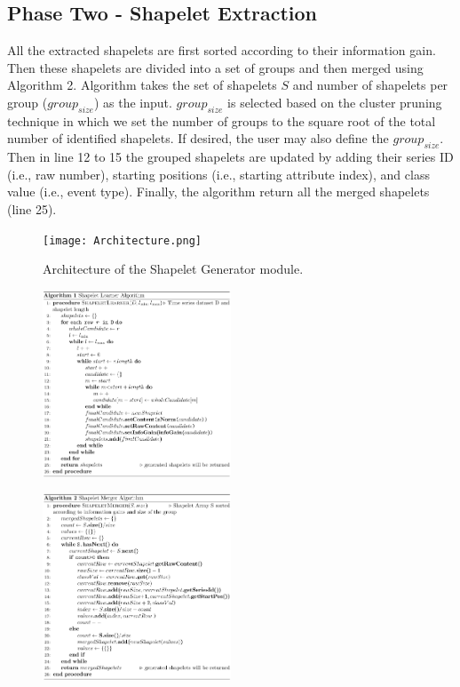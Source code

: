 \documentclass[conference]{IEEEtran}  %
\begin{document}
\subsection{Phase Two - Shapelet Extraction}
All the extracted shapelets are first sorted according to their information gain. Then these shapelets are divided into a set of groups and then merged using Algorithm 2. Algorithm takes the set of shapelets $S$ and number of shapelets per group ($group_{size}$) as the input. 
$group_{size}$ is selected based on the cluster pruning technique in which we set the number of groups to the square root of the total number of identified shapelets. If desired, the user may also define the $group_{size}$. Then in line 12 to 15 the grouped shapelets are updated by adding their series ID (i.e., raw number), starting positions (i.e., starting attribute index), and class value (i.e., event type). Finally, the algorithm return all the merged shapelets (line 25).

\begin{figure}
\texttt{[image: Architecture.png]}
\caption{Architecture of the Shapelet Generator module.}
\label{fig:hintgen}
\end{figure}

\begin{figure}
\includegraphics[width=0.5\textwidth]{algo1.png}\squeezeup\squeezeup\squeezeup
\end{figure}
\begin{figure}
\includegraphics[width=0.5\textwidth]{algo2.png}\squeezeup\squeezeup\squeezeup
\end{figure}
\end{document}
